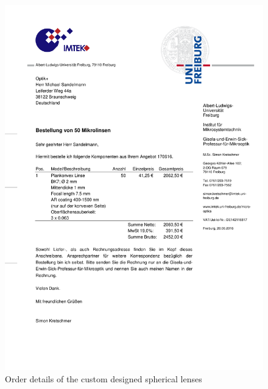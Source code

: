 \begin{figure}[h!]\centering \includegraphics[width=16cm]{appendix/lens.pdf}
      \caption{Order details of the custom designed spherical lenses}
\end{figure}

\clearpage
